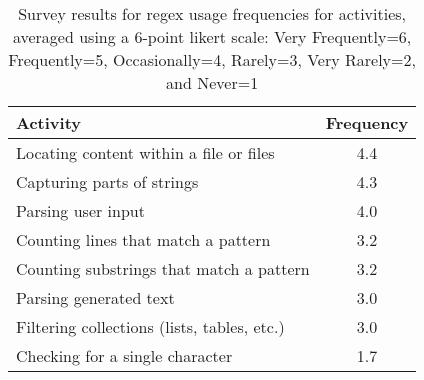 \begin{table}
\caption{Survey results for regex usage frequencies for  activities, averaged using a 6-point likert scale: Very Frequently=6, Frequently=5, Occasionally=4, Rarely=3, Very Rarely=2, and Never=1 \label{tab:regexactivities}}
\begin{center}
\begin{small}
\begin{tabular}{l|c}
\toprule
\textbf{Activity} & \textbf{Frequency} \\  \midrule \bigstrut
Locating content within a file or files & 4.4\\ \midrule \bigstrut
Capturing parts of strings & 4.3 \\ \midrule \bigstrut
Parsing user input & 4.0\\ \midrule \bigstrut
Counting lines that match a pattern & 3.2\\ \midrule \bigstrut
Counting  substrings that match a pattern & 3.2\\  \midrule \bigstrut
Parsing generated text & 3.0\\  \midrule \bigstrut
Filtering collections (lists, tables, etc.) & 3.0 \\ \midrule \bigstrut
Checking for a single character & 1.7\\
\bottomrule
\end{tabular}
\end{small}
\end{center}
\vspace{-12pt}
\end{table}
